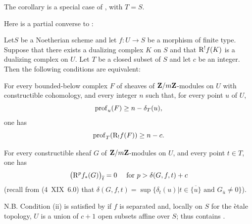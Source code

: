 The corollary is a special case of , with $T=S$.

Here is a partial converse to :

\begin{proposition} \label{XIV.4.7}
Let\pageoriginale $S$ be a Noetherian scheme and let $f\colon U\to S$ be a morphism of finite type. Suppose that there exists a dualizing complex $K$ on $S$ and that $\mathrm R^{!}f(K)$ is a dualizing complex on $U$. Let $T$ be a closed subset of $S$ and let $c$ be an integer. Then the following conditions are equivalent:
\begin{enumeratei}
\item
For every bounded-below complex $F$ of sheaves of $\mathbf Z/m\mathbf Z$-modules on $U$ with constructible cohomology, and every integer $n$ such that, for every point $u$ of $U$,
$$
\operatorname{prof}_{u}(F)\geq n-\delta_{T}(u),
$$
one has
$$
\operatorname{prof}_{T}(\mathrm R_{!}f(F))\geq n-c.
$$

\item
For every constructible sheaf $G$ of $\mathbf Z/m\mathbf Z$-modules on $U$, and every point $t\in T$, one has
$$
\big(\mathrm R^{p}f_{\ast}(G)\big)_{\overline{t}}=0\quad\textrm{ for }p>\delta(G, f, t)+c$$
(recall from (\textup{\SGA {}4~XIX~6.0}) that $\delta(G, f, t)=\sup\{ \delta_{t}(u)|t\in\overline{\{ u\} }\textrm{ and }G_{\overline{u}}\neq 0\}$).
\end{enumeratei}
\end{proposition}

N.B. Condition \textup{(ii)} is satisfied by  if $f$ is separated and, locally on $S$ for the \`etale topology, $U$ is a union of $c+1$ open subsets affine over $S$; thus  contains .

